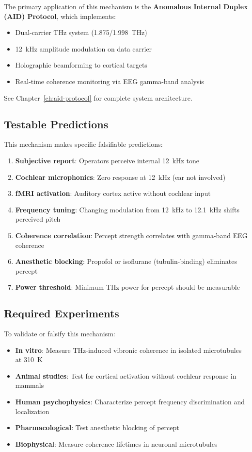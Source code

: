 The primary application of this mechanism is the \textbf{Anomalous Internal Duplex (AID) Protocol}, which implements:
\begin{itemize}
\item Dual-carrier THz system (1.875/1.998~THz)
\item 12~kHz amplitude modulation on data carrier
\item Holographic beamforming to cortical targets
\item Real-time coherence monitoring via EEG gamma-band analysis
\end{itemize}

See Chapter~\ref{ch:aid-protocol} for complete system architecture.

\subsection{Testable Predictions}

This mechanism makes specific falsifiable predictions:

\begin{enumerate}
\item \textbf{Subjective report}: Operators perceive internal 12~kHz tone
\item \textbf{Cochlear microphonics}: Zero response at 12~kHz (ear not involved)
\item \textbf{fMRI activation}: Auditory cortex active without cochlear input
\item \textbf{Frequency tuning}: Changing modulation from 12~kHz to 12.1~kHz shifts perceived pitch
\item \textbf{Coherence correlation}: Percept strength correlates with gamma-band EEG coherence
\item \textbf{Anesthetic blocking}: Propofol or isoflurane (tubulin-binding) eliminates percept
\item \textbf{Power threshold}: Minimum THz power for percept should be measurable
\end{enumerate}

\subsection{Required Experiments}

To validate or falsify this mechanism:

\begin{itemize}
\item \textbf{In vitro}: Measure THz-induced vibronic coherence in isolated microtubules at 310~K
\item \textbf{Animal studies}: Test for cortical activation without cochlear response in mammals
\item \textbf{Human psychophysics}: Characterize percept frequency discrimination and localization
\item \textbf{Pharmacological}: Test anesthetic blocking of percept
\item \textbf{Biophysical}: Measure coherence lifetimes in neuronal microtubules
\end{itemize}

